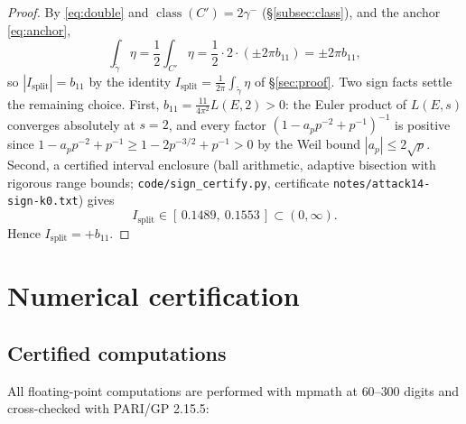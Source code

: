 \documentclass[preprint,12pt]{elsarticle}
\theoremstyle{definition}
\theoremstyle{remark}
\DeclareMathOperator{\class}{class}
\begin{document}
\begin{proof}
By \eqref{eq:double} and $\class(C')=2\gamma^-$
(\S\ref{subsec:class}), and the anchor \eqref{eq:anchor},
\[
  \int_{\tilde\gamma}\eta=\frac12\int_{C'}\eta
  =\frac12\cdot 2\cdot(\pm 2\pi b_{11})=\pm 2\pi b_{11},
\]
so $|I_{\mathrm{split}}|=b_{11}$ by the identity
$I_{\mathrm{split}}=\frac{1}{2\pi}\int_{\tilde\gamma}\eta$ of
\S\ref{sec:proof}. Two sign facts settle the remaining choice. First,
$b_{11}=\frac{11}{4\pi^2}L(E,2)>0$: the Euler product of $L(E,s)$
converges absolutely at $s=2$, and every factor
$(1-a_p p^{-2}+p^{-1})^{-1}$ is positive since
$1-a_p p^{-2}+p^{-1}\ge 1-2p^{-3/2}+p^{-1}>0$ by the Weil bound
$|a_p|\le2\sqrt p$. Second, a certified interval enclosure
(ball arithmetic, adaptive bisection with rigorous range bounds;
\texttt{code/sign\_certify.py}, certificate \texttt{notes/attack14-sign-k0.txt})
gives
\[
  I_{\mathrm{split}}\in[\,0.1489,\ 0.1553\,]\subset(0,\infty).
\]
Hence $I_{\mathrm{split}}=+b_{11}$. \qedhere
\end{proof}


\section{Numerical certification}
\label{sec:cert}

\subsection{Certified computations}

All floating-point computations are performed with mpmath at $60$--$300$
digits and cross-checked with PARI/GP 2.15.5:
\end{document}
